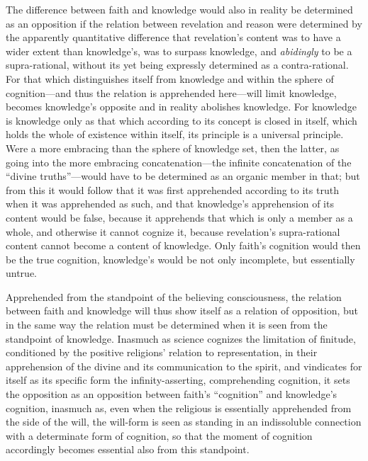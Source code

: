 \documentclass[12pt,a4paper]{book}
\begin{document}
The difference between faith and knowledge would also in reality be determined as
an opposition if the relation between revelation and reason were determined by the
apparently quantitative difference that revelation's content was to have a wider
extent than knowledge's, was to surpass knowledge, and \emph{abidingly} to be a
supra-rational, without its yet being expressly determined as a contra-rational.
For that which distinguishes itself from knowledge and within the sphere of
cognition---and thus the relation is apprehended here---will limit knowledge,
becomes knowledge's opposite and in reality abolishes knowledge. For knowledge is
knowledge only as that which according to its concept is closed in itself, which
holds the whole of existence within itself, its principle is a universal principle.
Were a more embracing than the sphere of knowledge set, then the latter, as going
into the more embracing concatenation---the infinite concatenation of the ``divine
truths''---would have to be determined as an organic member in that; but from this
it would follow that it was first apprehended according to its truth when it was
apprehended as such, and that knowledge's apprehension of its content would be
false, because it apprehends that which is only a member as a whole, and otherwise
it cannot cognize it, because revelation's supra-rational content cannot become a
content of knowledge. Only faith's cognition would then be the true cognition,
knowledge's would be not only incomplete, but essentially untrue.

Apprehended from the standpoint of the believing consciousness, the relation
between faith and knowledge will thus show itself as a relation of opposition, but
in the same way the relation must be determined when it is seen from the standpoint
of knowledge. Inasmuch as science cognizes the limitation of finitude, conditioned
by the positive religions' relation to representation, in their apprehension of the
divine and its communication to the spirit, and vindicates for itself as its
specific form the infinity-asserting, comprehending cognition, it sets the
opposition as an opposition between faith's ``cognition'' and knowledge's
cognition, inasmuch as, even when the religious is essentially apprehended from the
side of the will, the will-form is seen as standing in an indissoluble connection
with a determinate form of cognition, so that the moment of cognition accordingly
becomes essential also from this standpoint.
\end{document}
